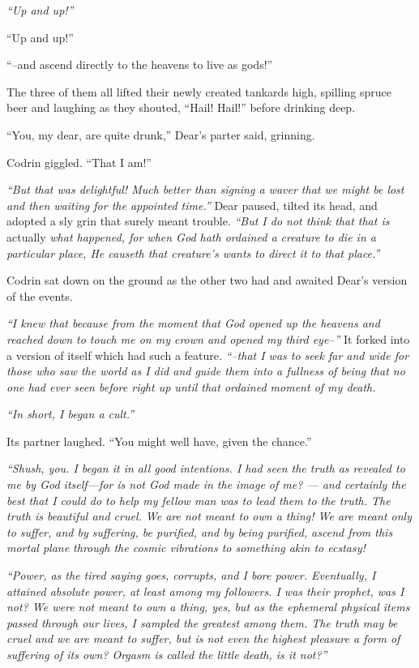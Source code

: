 \emph{``Up and up!''}

``Up and up!''

``--and ascend directly to the heavens to live as gods!''

The three of them all lifted their newly created tankards high, spilling spruce beer and laughing as they shouted, ``Hail! Hail!'' before drinking deep.

``You, my dear, are quite drunk,'' Dear's parter said, grinning.

Codrin giggled. ``That I am!''

\emph{``But that was delightful! Much better than signing a waver that we might be lost and then waiting for the appointed time.''} Dear paused, tilted its head, and adopted a sly grin that surely meant trouble. \emph{``But I do not think that that is} actually \emph{what happened, for when God hath ordained a creature to die in a particular place, He causeth that creature's wants to direct it to that place.''}

Codrin sat down on the ground as the other two had and awaited Dear's version of the events.

\emph{``I knew that because from the moment that God opened up the heavens and reached down to touch me on my crown and opened my third eye--''} It forked into a version of itself which had such a feature. \emph{``--that I was to seek far and wide for those who saw the world as I did and guide them into a fullness of being that no one had ever seen before right up until that ordained moment of my death.}

\emph{``In short, I began a cult.''}

Its partner laughed. ``You might well have, given the chance.''

\emph{``Shush, you. I began it in all good intentions. I had seen the truth as revealed to me by God itself---for is not God made in the image of me? — and certainly the best that I could do to help my fellow man was to lead them to the truth. The truth is beautiful and cruel. We are not meant to own a thing! We are meant only to suffer, and by suffering, be purified, and by being purified, ascend from this mortal plane through the cosmic vibrations to something akin to ecstasy!}

\emph{``Power, as the tired saying goes, corrupts, and I bore power. Eventually, I attained absolute power, at least among my followers. I was their prophet, was I not? We were not meant to own a thing, yes, but as the ephemeral physical items passed through our lives, I sampled the greatest among them. The truth may be cruel and we are meant to suffer, but is not even the highest pleasure a form of suffering of its own? Orgasm is called the little death, is it not?''}

